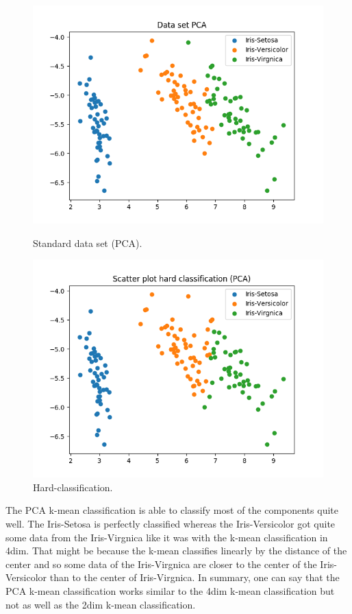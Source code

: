 \documentclass[a4paper]{article}
\begin{document}

\begin{figure}[htp]
\begin{minipage}{0.4\textwidth}
	\centering
  \includegraphics[scale=0.6]{plots/basic_scenario3_cmpnt3.png}
  \caption{Standard data set (PCA).}
\end{minipage}
\hfill
\begin{minipage}{0.4\textwidth}
	\centering
  \includegraphics[scale=0.6]{plots/hard_scatter_scenario3_cmpnt3.png}
  \caption{Hard-classification.}
\end{minipage}
\end{figure}

\noindent
The PCA k-mean classification is able to classify most of the components quite well. The Iris-Setosa is perfectly classified whereas the Iris-Versicolor got quite some data from the Iris-Virgnica like it was with the k-mean classification in 4dim. That might be because the k-mean classifies linearly by the distance of the center and so some data of the Iris-Virgnica are closer to the center of the Iris-Versicolor than to the center of Iris-Virgnica. In summary, one can say that the PCA k-mean classification works similar to the 4dim k-mean classification but not as well as the 2dim k-mean classification. \\
\end{document}
